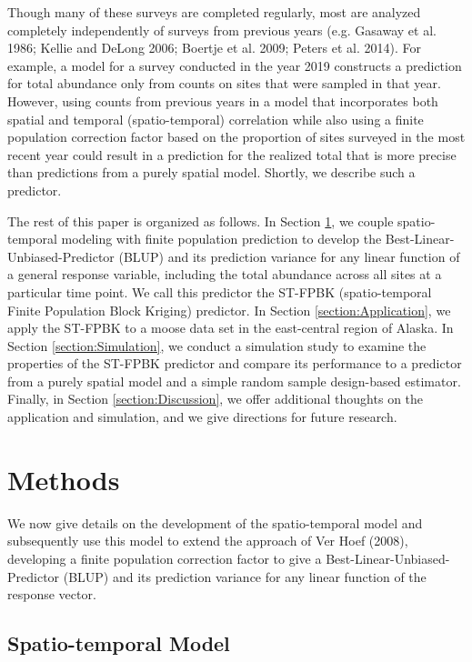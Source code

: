 \documentclass[smallextended]{svjour3}       %
\begin{document}
Though many of these surveys are completed regularly, most are analyzed
completely independently of surveys from previous years (e.g. Gasaway et
al. 1986; Kellie and DeLong 2006; Boertje et al. 2009; Peters et al.
2014). For example, a model for a survey conducted in the year 2019
constructs a prediction for total abundance only from counts on sites
that were sampled in that year. However, using counts from previous
years in a model that incorporates both spatial and temporal
(spatio-temporal) correlation while also using a finite population
correction factor based on the proportion of sites surveyed in the most
recent year could result in a prediction for the realized total that is
more precise than predictions from a purely spatial model. Shortly, we
describe such a predictor.

The rest of this paper is organized as follows. In Section
\ref{section:Methods}, we couple spatio-temporal modeling with finite
population prediction to develop the Best-Linear-Unbiased-Predictor
(BLUP) and its prediction variance for any linear function of a general
response variable, including the total abundance across all sites at a
particular time point. We call this predictor the ST-FPBK
(spatio-temporal Finite Population Block Kriging) predictor. In Section
\ref{section:Application}, we apply the ST-FPBK to a moose data set in
the east-central region of Alaska. In Section \ref{section:Simulation},
we conduct a simulation study to examine the properties of the ST-FPBK
predictor and compare its performance to a predictor from a purely
spatial model and a simple random sample design-based estimator.
Finally, in Section \ref{section:Discussion}, we offer additional
thoughts on the application and simulation, and we give directions for
future research.

\hypertarget{section:Methods}{%
\section{Methods}\label{section:Methods}}

We now give details on the development of the spatio-temporal model and
subsequently use this model to extend the approach of Ver Hoef (2008),
developing a finite population correction factor to give a
Best-Linear-Unbiased-Predictor (BLUP) and its prediction variance for
any linear function of the response vector.

\hypertarget{spatio-temporal-model}{%
\subsection{Spatio-temporal Model}\label{spatio-temporal-model}}
\end{document}
